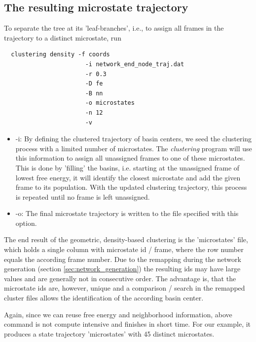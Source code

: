 \documentclass[12pt,a4paper,twoside,english,fleqn]{article}
\begin{document}
\subsection{The resulting microstate trajectory}
To separate the tree at its 'leaf-branches', i.e., to assign all frames in the
trajectory to a distinct microstate, run
\begin{lstlisting}
  clustering density -f coords
                       -i network_end_node_traj.dat
                       -r 0.3
                       -D fe
                       -B nn
                       -o microstates
                       -n 12
                       -v
\end{lstlisting}

\begin{itemize}
  \item -i: By defining the clustered trajectory of basin centers, we seed the
            clustering process with a limited number of microstates.
            The \emph{clustering} program will use this information to assign
            all unassigned frames to one of these microstates.
            This is done by 'filling' the basins, i.e. starting at the
            unassigned frame of lowest free energy, it will identify the
            closest microstate and add the given frame to its population.
            With the updated clustering trajectory, this process is repeated
            until no frame is left unassigned.
  \item -o: The final microstate trajectory is written to the file specified
            with this option.
\end{itemize}

The end result of the geometric, density-based clustering is the 'microstates'
file, which holds a single column with microstate id / frame, where the row
number equals the according frame number. Due to the remapping during the
network generation (section \ref{sec:network_generation}) the resulting ids
may have large values and are generally not in consecutive order.
The advantage is, that the microstate ids are, however, unique and a
comparison / search in the remapped cluster files allows the identification of
the according basin center.


\begin{mdframed}[innertopmargin=20pt]
  Again, since we can reuse free energy and neighborhood information, above
  command is not compute intensive and finishes in short time.
  For our example, it produces a state trajectory 'microstates' with 45
  distinct microstates.
\end{mdframed}
\end{document}
